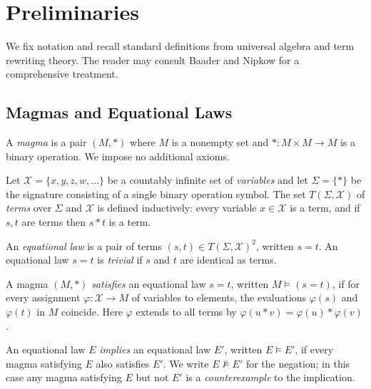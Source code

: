 \section{Preliminaries}
\label{sec:prelim}

We fix notation and recall standard definitions from universal algebra and term
rewriting theory.  The reader may consult Baader and Nipkow \cite{baader1999term}
for a comprehensive treatment.

\subsection{Magmas and Equational Laws}

\begin{definition}
A \emph{magma} is a pair $(M, *)$ where $M$ is a nonempty set and
$* \colon M \times M \to M$ is a binary operation.  We impose no additional axioms.
\end{definition}

Let $\mathcal{X} = \{x, y, z, w, \ldots\}$ be a countably infinite set of
\emph{variables} and let $\Sigma = \{*\}$ be the signature consisting of a single
binary operation symbol.  The set $T(\Sigma, \mathcal{X})$ of \emph{terms} over
$\Sigma$ and $\mathcal{X}$ is defined inductively: every variable $x \in \mathcal{X}$
is a term, and if $s, t$ are terms then $s * t$ is a term.

\begin{definition}
An \emph{equational law} is a pair of terms $(s, t) \in T(\Sigma, \mathcal{X})^2$,
written $s = t$.  An equational law $s = t$ is \emph{trivial} if $s$ and $t$ are
identical as terms.
\end{definition}

\begin{definition}
A magma $(M, *)$ \emph{satisfies} an equational law $s = t$, written
$M \models (s = t)$, if for every assignment $\varphi \colon \mathcal{X} \to M$ of
variables to elements, the evaluations $\varphi(s)$ and $\varphi(t)$ in $M$ coincide.
Here $\varphi$ extends to all terms by $\varphi(u * v) = \varphi(u) * \varphi(v)$.
\end{definition}

\begin{definition}\label{def:implication}
An equational law $E$ \emph{implies} an equational law $E'$, written $E \models E'$,
if every magma satisfying $E$ also satisfies $E'$.  We write $E \not\models E'$ for
the negation; in this case any magma satisfying $E$ but not $E'$ is a
\emph{counterexample} to the implication.
\end{definition}

